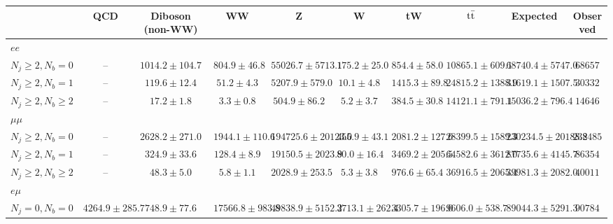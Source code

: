 
    \begin{tabular}{l|ccccccc|cc}
        \hline
                                           & QCD                  & Diboson (non-WW)   & WW                 & Z                      & W & tW                   & $\rm t\bar{t}$         & Expected               & Observed \\
        \hline
        \multicolumn{10}{l}{$ee$}         \\
        \hline
        $N_{j} \geq 2, N_{b} = 0$          & --                   & $1014.2 \pm 104.7$ & $804.9 \pm 46.8$   & $55026.7 \pm 5713.1$   & $175.2 \pm 25.0$     & $854.4 \pm 58.0$     & $10865.1 \pm 609.1$    & $68740.4 \pm 5747.0$   & $68657$  \\
        $N_{j} \geq 2, N_{b} = 1$          & --                   & $119.6 \pm 12.4$   & $51.2 \pm 4.3$     & $5207.9 \pm 579.0$     & $10.1 \pm 4.8$       & $1415.3 \pm 89.8$    & $24815.2 \pm 1388.9$   & $31619.1 \pm 1507.5$   & $30332$  \\
        $N_{j} \geq 2, N_{b} \geq 2$       & --                   & $17.2 \pm 1.8$     & $3.3 \pm 0.8$      & $504.9 \pm 86.2$       & $5.2 \pm 3.7$        & $384.5 \pm 30.8$     & $14121.1 \pm 791.1$    & $15036.2 \pm 796.4$    & $14646$  \\
        \hline
        \multicolumn{10}{l}{$\mu\mu$}     \\
        \hline
        $N_{j} \geq 2, N_{b} = 0$          & --                   & $2628.2 \pm 271.0$ & $1944.1 \pm 110.6$ & $194725.6 \pm 20123.0$ & $455.9 \pm 43.1$     & $2081.2 \pm 127.6$   & $28399.5 \pm 1589.3$   & $230234.5 \pm 20188.2$ & $238485$ \\
        $N_{j} \geq 2, N_{b} = 1$          & --                   & $324.9 \pm 33.6$   & $128.4 \pm 8.9$    & $19150.5 \pm 2023.9$   & $80.0 \pm 16.4$      & $3469.2 \pm 205.5$   & $64582.6 \pm 3612.0$   & $87735.6 \pm 4145.7$   & $86354$  \\
        $N_{j} \geq 2, N_{b} \geq 2$       & --                   & $48.3 \pm 5.0$     & $5.8 \pm 1.1$      & $2028.9 \pm 253.5$     & $5.3 \pm 3.8$        & $976.6 \pm 65.4$     & $36916.5 \pm 2065.4$   & $39981.3 \pm 2082.0$   & $40011$  \\
        \hline
        \multicolumn{10}{l}{$e\mu$}         \\
        \hline
        $N_{j} = 0, N_{b} = 0$       & $4264.9 \pm 285.7$ & $748.9 \pm 77.6$ & $17566.8 \pm 983.8$ & $49838.9 \pm 5152.2$ & $3713.1 \pm 262.4$ & $3305.7 \pm 196.0$ & $9606.0 \pm 538.7$   & $89044.3 \pm 5291.3$ & $90784$  \\

\end{tabular}
